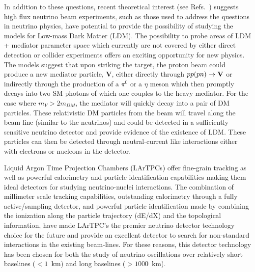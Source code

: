 In addition to these questions, recent theoretical interest (see Refs.~\cite{if:ldm-1, if:ldm-2}) suggests high flux neutrino beam experiments, such as those used to address the questions in neutrino physics, have potential to provide the possibility of studying the models for Low-mass Dark Matter (LDM). The possibility to probe areas of LDM + mediator parameter space which currently are not covered by either direct detection or collider experiments offers an exciting opportunity for new physics. The models suggest that upon striking the target, the proton beam could produce a new mediator particle, $\textbf{V}$, either directly through $pp(pn)\rightarrow \bf {V}$ or indirectly through the production of a $\pi^{0}$ or a $\eta$ meson which then promptly decays into two SM photons of which one couples to the heavy mediator. For the case where $m_{V} > 2m_{DM}$, the mediator will quickly decay into a pair of DM particles.  These relativistic DM particles from the beam will travel along the beam-line (similar to the neutrinos) and could be detected in a sufficiently sensitive neutrino detector and provide evidence of the existence of LDM. These particles can then be detected through neutral-current like interactions either with electrons or nucleons in the detector.

Liquid Argon Time Projection Chambers (LArTPCs) offer fine-grain tracking as well as powerful calorimetry and particle identification capabilities making them ideal detectors for studying neutrino-nuclei interactions. The combination of millimeter scale tracking capabilities, outstanding calorimetry through a fully active/sampling detector, and powerful particle identification made by combining the ionization along the particle trajectory (dE/dX) and the topological information, have made LArTPC's the premier neutrino detector technology choice for the future and provide an excellent detector to search for non-standard interactions in the existing beam-lines. For these reasons, this detector technology has been chosen for both the study of neutrino oscillations over relatively short baselines ($<1$~km) and long baselines ($>1000$~km). 

%


